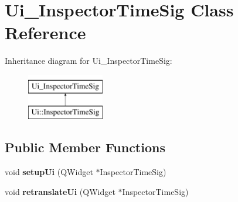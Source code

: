 \hypertarget{class_ui___inspector_time_sig}{}\section{Ui\+\_\+\+Inspector\+Time\+Sig Class Reference}
\label{class_ui___inspector_time_sig}
Inheritance diagram for Ui\+\_\+\+Inspector\+Time\+Sig\+:\begin{figure}[H]
\begin{center}
\leavevmode
\includegraphics[height=2.000000cm]{class_ui___inspector_time_sig}
\end{center}
\end{figure}
\subsection*{Public Member Functions}
\begin{DoxyCompactItemize}
\item 
\mbox{\label{class_ui___inspector_time_sig_a46b8dcaa82d56c80ac51b8c9d03865ec}} 
void {\bfseries setup\+Ui} (Q\+Widget $\ast$Inspector\+Time\+Sig)
\item 
\mbox{\label{class_ui___inspector_time_sig_ae36b339f0af98f23c34efc95b5af948d}} 
void {\bfseries retranslate\+Ui} (Q\+Widget $\ast$Inspector\+Time\+Sig)
\end{DoxyCompactItemize}
